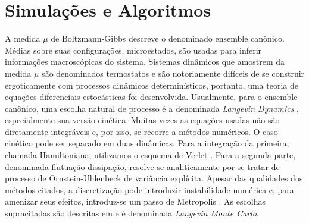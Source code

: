 \chapter{Simulações e Algoritmos}
\label{Capitulo: Simulações}

A medida $\mu$ de Boltzmann-Gibbs descreve o denominado ensemble canônico. Médias sobre suas configurações, microestados, são usadas para inferir informações macroscópicas do sistema. Sistemas dinâmicos que amostrem da medida $\mu$ são denominados termostatos e são notoriamente difíceis de se construir ergoticamente com processos dinâmicos determinísticos, portanto, uma teoria de equações diferenciais estocásticas foi desenvolvida. Usualmente, para o ensemble canônico, uma escolha natural de processo é a denominada \textit{Langevin Dynamics} \cite[Capítulo~6]{leimmolecular}, especialmente sua versão cinética. Muitas vezes as equações usadas não são diretamente integráveis e, por isso, se recorre a métodos numéricos. O caso cinético pode ser separado em duas dinâmicas. Para a integração da primeira, chamada Hamiltoniana, utilizamos o esquema de Verlet \cite{Verlet}. Para a segunda parte, denominada flutuação-dissipação, resolve-se analiticamente por se tratar de processo de Ornstein-Uhlenbeck de variância explícita. Apesar das qualidades dos métodos citados, a discretização pode introduzir instabilidade numérica e, para amenizar seus efeitos, introduz-se um passo de Metropolis \cite[Apêndice~C]{leimmolecular}. As escolhas supracitadas são descritas em \cite{Chafa2018} e é denominada \textit{Langevin Monte Carlo}.






%









